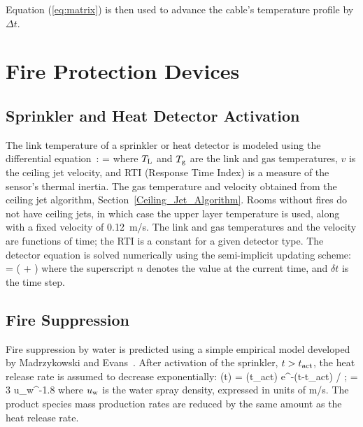 \noindent Equation (\ref{eq:matrix}) is then used to
advance the cable's temperature profile by $\Delta t$.






\chapter{Fire Protection Devices}



\section{Sprinkler and Heat Detector Activation}

The link temperature of a sprinkler or heat detector is modeled using the differential equation~\cite{Heskestad:1976}:
\be
    =  \brackets{\Tg - \TL}  \label{eq:RTI}
\ee
where $T_{\rm L}$ and $T_{\rm g}$ are the link and gas temperatures, $v$ is the ceiling jet velocity, and RTI (Response Time Index) is a measure of the sensor's thermal inertia. The gas temperature and velocity obtained from the ceiling jet algorithm, Section~\ref{Ceiling_Jet_Algorithm}. Rooms without fires do not have ceiling jets, in which case the upper layer temperature is used, along with a fixed velocity of 0.12~m/s. The link and gas temperatures and the velocity are functions of time; the RTI is a constant for a given detector type. The detector equation is solved numerically using the semi-implicit updating scheme:
\be
    =  \left(    +    \right) \label{eq:RTI_rewritten}
\ee
where the superscript $n$ denotes the value at the current time, and $\delta t$ is the time step.


\section{Fire Suppression} \label{sec:suppression}

Fire suppression by water is predicted using a simple empirical model developed by Madrzykowski \cite{Madrzykowski:1992} and Evans~\cite{Evans:1993}. After activation of the sprinkler, $t > t_{\rm act}$, the heat release rate is assumed to decrease exponentially:
\be
   \dQ(t) = \dQ(t_{\rm act}) \; {\rm e}^{-(t-t_{\rm act}) /\tau}   \quad ; \quad \tau = 3 u_{\rm w}^{-1.8}
\ee
where $u_{\rm w}$ is the water spray density, expressed in units of m/s. The product species mass production rates are reduced by the same amount as the heat release rate.

